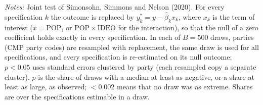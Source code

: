 \begin{table}[ht]
\centering
\caption{Joint inference for the specification curve under the null of no effect}
\label{tab:speccurve:joint}
\footnotesize
{}
\begin{minipage}{0.95\linewidth}\scriptsize\vspace{0.5ex}
\textit{Notes:} Joint test of Simonsohn, Simmons and Nelson (2020). For every specification $k$ the outcome is replaced by $y^*_k = y - \hat\beta_k x_k$, where $x_k$ is the term of interest ($x=\mathrm{POP}$, or $\mathrm{POP}\times\mathrm{IDEO}$ for the interaction), so that the null of a zero coefficient holds exactly in every specification. In each of $B=500$ draws, parties (CMP party codes) are resampled with replacement, the same draw is used for all specifications, and every specification is re-estimated on its null outcome; $p<0.05$ uses standard errors clustered by party (each resampled copy a separate cluster). $p$ is the share of draws with a median at least as negative, or a share at least as large, as observed; $<0.002$ means that no draw was as extreme. Shares are over the specifications estimable in a draw.
\end{minipage}
\end{table}
